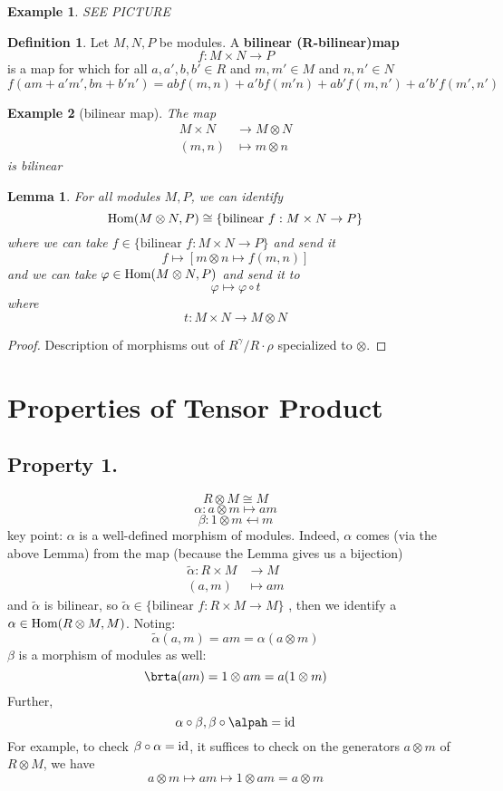 \documentclass[12pt]{article}
\newcommand{\ho}[2]{\textup{Hom}(#1,#2)}
\newcommand{\mapping}[5]{\begin{align*}
#1\colon #2 &\to #3\\
#4 & \mapsto #5
\end{align*}}
\newcommand{\mapp}[4]{\begin{align*}
#1 &\to #2\\
#3 & \mapsto #4
\end{align*}}
\newtheorem{lemma}[theorem]{Lemma}
\newtheorem*{eg}{Example}
\theoremstyle{definition}
\newtheorem{definition}[theorem]{Definition}
\begin{document}
\begin{eg}
SEE PICTURE


\end{eg}
\begin{definition}
Let $M,N,P$ be modules. A \textbf{bilinear (R-bilinear)map} 
\[
f: M\times N \rightarrow P
\]
is a map for which for all $a,a',b,b' \in R$ and $m,m'\in M$ and $n,n'\in N$
\[
f(am+a'm', bn+b'n') = abf(m,n)+a'bf(m'n)+ ab'f(m,n')+a'b'f(m',n')
\]
\end{definition}
\begin{eg}[bilinear map]
The map
\[
\mapp{M\times N}{M\otimes N}{(m,n)}{m \otimes n}
\]
is bilinear
\end{eg}
\begin{lemma}
For all modules $M,P$, we can identify
\[
\ho{M\otimes N}{P} \cong \{\text{bilinear }f:M\times N\rightarrow P\}
\]
where we can take $f\in \{\text{bilinear }f:M\times N\rightarrow P\}$ and send it
\[
f \mapsto [m\otimes n \mapsto f(m,n)]
\]
and we can take $\varphi \in \ho{M\otimes N}{P}$ and send it to
\[
\varphi \mapsto \varphi \circ t
\]
where
\[
t: M\times N \rightarrow M \otimes N
\]
\end{lemma}
\begin{proof}
Description of morphisms out of $R^{\gamma}/R\cdot \rho$ specialized to $\otimes$.
\end{proof}
\section*{Properties of Tensor Product}
\subsection*{Property 1.}
\[
R \otimes M \cong M
\]
\[
\alpha: a \otimes m \mapsto am
\]
\[
\beta: 1 \otimes m \mapsfrom m
\]
key point: $\alpha$ is a well-defined morphism of modules. Indeed, $\alpha$ comes (via the above Lemma) from the map (because the Lemma gives us a bijection)
\[
\mapping{\tilde{\alpha}}{R\times M}{M}{(a,m)}{am}
\]
and $\tilde{\alpha}$ is bilinear, so $\tilde{\alpha} \in \{\text{bilinear }f:R\times M\rightarrow M\}$ , then we identify a $\alpha \in \ho{R\otimes M}{M}$. Noting: 
\[
\tilde{\alpha}(a,m) = am = \alpha(a \otimes m)
\]
$\beta$ is a morphism of modules as well:
\[
\brta(am) = 1 \otimes am = a(1 \otimes m)
\]
Further,
\[
\alpha \circ \beta , \beta \circ \alpah = \textup{id}
\]
For example, to check $\beta \circ \alpha = \textup{id}$, it suffices to check on the generators $a \otimes m$ of $R \otimes M$, we have
\[
a \otimes m \mapsto am \mapsto 1 \otimes am = a \otimes m 
\]
\end{document}
